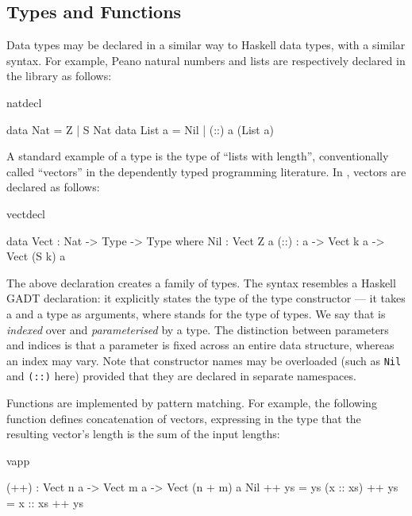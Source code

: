 \subsection{Types and Functions}

Data types may be declared in a similar way to Haskell data types, with a
similar syntax. For example, Peano natural numbers and lists
are respectively declared in the library as follows:

\begin{SaveVerbatim}{natdecl}

data Nat    = Z   | S Nat 
data List a = Nil | (::) a (List a)

\end{SaveVerbatim}

\noindent
A standard example of a  type is the type of ``lists with
length'', conventionally called ``vectors'' in the dependently typed
programming literature. In \Idris{}, vectors are declared as follows:

\begin{SaveVerbatim}{vectdecl}

data Vect : Nat -> Type -> Type where
   Nil  : Vect Z a
   (::) : a -> Vect k a -> Vect (S k) a

\end{SaveVerbatim}

\noindent
The above declaration creates a family of types. The syntax resembles a Haskell
GADT declaration: it explicitly states the type
of the type constructor  --- it takes a  and a type as
arguments, where  stands for the type of types. We say that 
is \emph{indexed} over  and \emph{parameterised} by a type. 
The distinction between parameters and indices is that a parameter is fixed
across an entire data structure, whereas an index may vary.
Note that constructor names may be overloaded (such as \texttt{Nil} and
\texttt{(::)} here) provided that they are declared in separate namespaces.

Functions are implemented by pattern matching. For example, the following
function defines concatenation of vectors, expressing in the type that
the resulting vector's length is the sum of the input lengths:

\begin{SaveVerbatim}{vapp}

(++) : Vect n a -> Vect m a -> Vect (n + m) a
Nil       ++ ys = ys
(x :: xs) ++ ys = x :: xs ++ ys

\end{SaveVerbatim}

